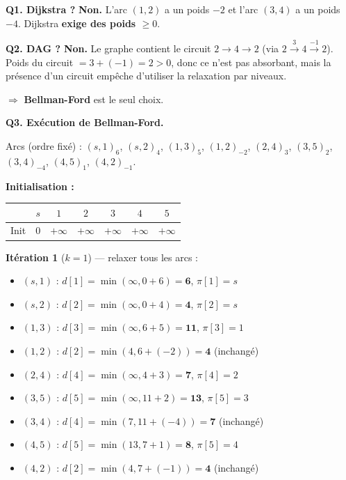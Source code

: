 \documentclass[12pt,a4paper]{article}
\begin{document}
\begin{correction}
\textbf{Q1. Dijkstra ?} \textbf{Non.} L'arc $(1,2)$ a un poids $-2$ et l'arc $(3,4)$ a un poids $-4$. Dijkstra \textbf{exige des poids $\geq 0$}.

\medskip
\textbf{Q2. DAG ?} \textbf{Non.} Le graphe contient le circuit $2 \to 4 \to 2$ (via $2 \xrightarrow{3} 4 \xrightarrow{-1} 2$). Poids du circuit $= 3 + (-1) = 2 > 0$, donc ce n'est pas absorbant, mais la pr\'esence d'un circuit emp\^eche d'utiliser la relaxation par niveaux.

$\Rightarrow$ \textbf{Bellman-Ford} est le seul choix.

\medskip
\textbf{Q3. Ex\'ecution de Bellman-Ford.}

Arcs (ordre fix\'e) : $(s,1)_6$, $(s,2)_4$, $(1,3)_5$, $(1,2)_{-2}$, $(2,4)_3$, $(3,5)_2$, $(3,4)_{-4}$, $(4,5)_1$, $(4,2)_{-1}$.

\medskip
\textbf{Initialisation :}

\begin{center}
\renewcommand{\arraystretch}{1.2}
\begin{tabular}{|c|c|c|c|c|c|c|}
\hline
& $s$ & $1$ & $2$ & $3$ & $4$ & $5$ \\\hline
Init & $0$ & $+\infty$ & $+\infty$ & $+\infty$ & $+\infty$ & $+\infty$ \\\hline
\end{tabular}
\end{center}

\textbf{It\'eration 1} ($k=1$) --- relaxer tous les arcs :
\begin{itemize}[nosep]
    \item $(s,1)$ : $d[1] = \min(\infty, 0+6) = \mathbf{6}$, $\pi[1]=s$
    \item $(s,2)$ : $d[2] = \min(\infty, 0+4) = \mathbf{4}$, $\pi[2]=s$
    \item $(1,3)$ : $d[3] = \min(\infty, 6+5) = \mathbf{11}$, $\pi[3]=1$
    \item $(1,2)$ : $d[2] = \min(4, 6+(-2)) = \mathbf{4}$ (inchang\'e)
    \item $(2,4)$ : $d[4] = \min(\infty, 4+3) = \mathbf{7}$, $\pi[4]=2$
    \item $(3,5)$ : $d[5] = \min(\infty, 11+2) = \mathbf{13}$, $\pi[5]=3$
    \item $(3,4)$ : $d[4] = \min(7, 11+(-4)) = \mathbf{7}$ (inchang\'e)
    \item $(4,5)$ : $d[5] = \min(13, 7+1) = \mathbf{8}$, $\pi[5]=4$
    \item $(4,2)$ : $d[2] = \min(4, 7+(-1)) = \mathbf{4}$ (inchang\'e)
\end{itemize}


\end{correction}
\end{document}
